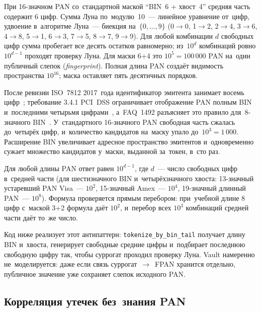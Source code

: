 При 16-значном PAN со~стандартной маской \enquote{BIN~6 + хвост~4}
средняя часть содержит 6 цифр. Сумма Луна по~модулю~10~---
линейное уравнение от~цифр, удвоение в~алгоритме
Луна~--- биекция на~$\{0,\dots,9\}$ (0$\to$0, 1$\to$2, 2$\to$4,
3$\to$6, 4$\to$8, 5$\to$1, 6$\to$3, 7$\to$5, 8$\to$7, 9$\to$9). Для
любой комбинации $d$ свободных цифр сумма пробегает все десять
остатков равномерно; из~$10^d$ комбинаций ровно $10^{d-1}$ проходят
проверку Луна. Для маски 6+4 это $10^5 = 100\,000$ PAN
на~один публичный слепок (\textit{fingerprint}). Полная длина PAN
создаёт видимость пространства $10^{16}$; маска оставляет пять
десятичных порядков.

После ревизии ISO~7812 2017~года идентификатор эмитента занимает
восемь цифр~\cite{iso-7812-transition}; требование 3.4.1 PCI~DSS ограничивает
отображение PAN полным BIN и~последними четырьмя цифрами~\cite{pci-dss-4},
а~FAQ~1492 разъясняет это правило для~8-значного BIN~\cite{pci-faq-1492}.
У~стандартного 16-значного PAN свободная часть сжалась до~четырёх цифр,
и~количество кандидатов на~маску упало до~$10^3 = 1\,000$. Расширение
BIN увеличивает адресное пространство эмитентов и~одновременно сужает
множество кандидатов у~маски, выданной за~токен, в~сто раз.

Для любой длины PAN ответ равен $10^{d-1}$, где $d$~--- число свободных
цифр в~средней части (для шестизначного BIN и~четырёхзначного хвоста:
  13-значный устаревший PAN Visa~--- $10^2$, 15-значный Amex~--- $10^4$,
19-значный длинный PAN~--- $10^8$).
Формула проверяется прямым перебором: при~учебной длине 8 цифр
с~маской 3+2 формула даёт $10^2$, и~перебор всех $10^3$ комбинаций
средней части даёт то~же число.

Код ниже реализует этот антипаттерн: \texttt{tokenize\_by\_bin\_tail}
получает длину BIN и~хвоста, генерирует свободные средние цифры
и~подбирает последнюю свободную цифру так, чтобы суррогат проходил проверку
Луна. Vault намеренно не~моделируется: даже если связь суррогат~$\to$~FPAN
хранится отдельно, публичное значение уже сохраняет слепок исходного PAN.


\subsection*{Корреляция утечек без~знания PAN}


